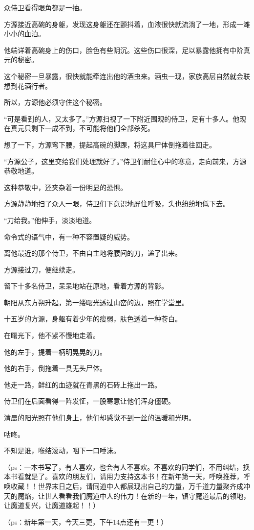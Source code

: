 \begin{this_body}
众侍卫看得眼角都是一抽。

方源接近高碗的身躯，发现这身躯还在颤抖着，血液很快就流淌了一地，形成一滩小小的血泊。

他端详着高碗身上的伤口，脸色有些阴沉。这些伤口很深，足以暴露他拥有中阶真元的秘密。

这个秘密一旦暴露，很快就能牵连出他的酒虫来。酒虫一现，家族高层自然就会联想到花酒行者。

所以，方源他必须守住这个秘密。

“可是看到的人，又太多了。”方源扫视了一下附近围观的侍卫，足有十多人。他现在真元只剩下一成不到，不可能将他们全部杀死。

想了一下，方源弯下腰，提起高碗的脚踝，将这具尸体倒拖着往回走。

“方源公子，这里交给我们处理就好了。”侍卫们耐住心中的寒意，走向前来，方源恭敬地道。

这种恭敬中，还夹杂着一份明显的恐惧。

方源静静地扫了众人一眼，侍卫们下意识地屏住呼吸，头也纷纷地低下去。

“刀给我。”他伸手，淡淡地道。

命令式的语气中，有一种不容置疑的威势。

离他最近的那个侍卫，不由自主地将腰间的刀，递了出来。

方源接过刀，便继续走。

留下十多名侍卫，呆呆地站在原地，看着方源的背影。

朝阳从东方朔升起，第一缕曙光透过山峦的边，照在学堂里。

十五岁的方源，身躯有着少年的瘦弱，肤色透着一种苍白。

在曙光下，他不紧不慢地走着。

他的左手，提着一柄明晃晃的刀。

他的右手，倒拖着一具无头尸体。

他走一路，鲜红的血迹就在青黑的石砖上拖出一路。

侍卫们在后面看得一阵发怔，一股寒意让他们浑身僵硬。

清晨的阳光照在他们身上，他们却感觉不到一丝的温暖和光明。

咕咚。

不知是谁，喉结滚动，咽下一口唾沫。

（ps：一本书写了，有人喜欢，也会有人不喜欢。不喜欢的同学们，不用纠结，换本书看就是了。喜欢的朋友们，请用力支持这本书！在新年第一天，呼唤推荐，呼唤收藏！！世界末日之后，请同道中人都展现出自己的力量，万千道力量聚齐成冲天的魔焰，让世人看看我们魔道中人的伟力！在新的一年，镇守魔道最后的领地，让魔道复兴，让魔道雄起！！）

（ps：新年第一天，今天三更，下午14点还有一更！）

\end{this_body}

